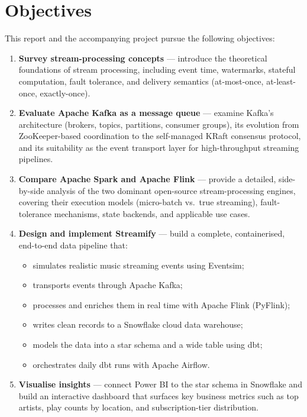 \section{Objectives}

This report and the accompanying project pursue the following objectives:

\begin{enumerate}
  \item \textbf{Survey stream-processing concepts} — introduce the theoretical foundations of stream processing, including event time, watermarks, stateful computation, fault tolerance, and delivery semantics (at-most-once, at-least-once, exactly-once).

  \item \textbf{Evaluate Apache Kafka as a message queue} — examine Kafka's architecture (brokers, topics, partitions, consumer groups), its evolution from ZooKeeper-based coordination to the self-managed KRaft consensus protocol, and its suitability as the event transport layer for high-throughput streaming pipelines.

  \item \textbf{Compare Apache Spark and Apache Flink} — provide a detailed, side-by-side analysis of the two dominant open-source stream-processing engines, covering their execution models (micro-batch vs.\ true streaming), fault-tolerance mechanisms, state backends, and applicable use cases.

  \item \textbf{Design and implement Streamify} — build a complete, containerised, end-to-end data pipeline that:
    \begin{itemize}
      \item simulates realistic music streaming events using Eventsim;
      \item transports events through Apache Kafka;
      \item processes and enriches them in real time with Apache Flink (PyFlink);
      \item writes clean records to a Snowflake cloud data warehouse;
      \item models the data into a star schema and a wide table using dbt;
      \item orchestrates daily dbt runs with Apache Airflow.
    \end{itemize}

  \item \textbf{Visualise insights} — connect Power BI to the star schema in Snowflake and build an interactive dashboard that surfaces key business metrics such as top artists, play counts by location, and subscription-tier distribution.
\end{enumerate}
